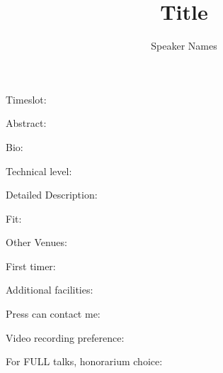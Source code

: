 \documentclass[12pt]{article}
\title{Title}
\author{Speaker Names}
\begin{document}
\maketitle

Timeslot:

Abstract: 

Bio:

Technical level:

Detailed Description: 

Fit: 

Other Venues: 

First timer: 

Additional facilities: 

Press can contact me:

Video recording preference: 


For FULL talks, honorarium choice: 
\end{document}
